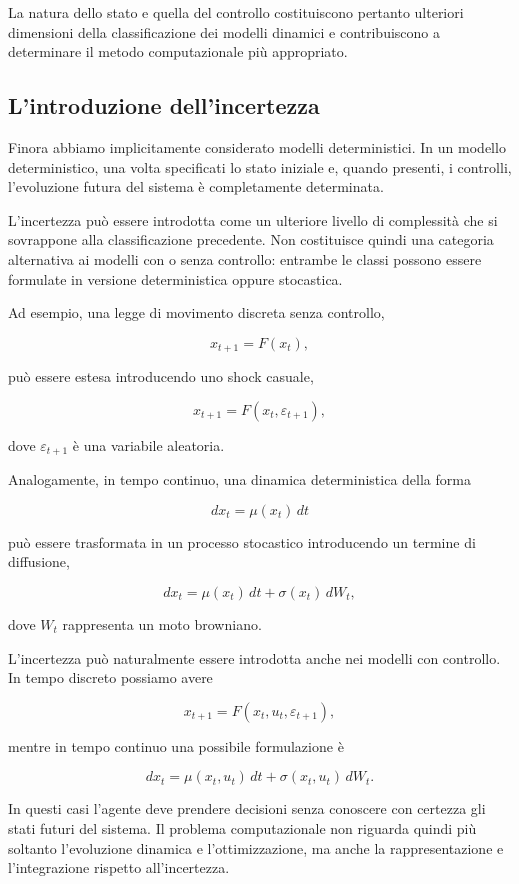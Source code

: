 \documentclass{book}
\begin{document}
La natura dello stato e quella del controllo costituiscono pertanto ulteriori dimensioni della classificazione dei modelli dinamici e contribuiscono a determinare il metodo computazionale più appropriato.

\subsection{L'introduzione dell'incertezza}

Finora abbiamo implicitamente considerato modelli deterministici. In un modello deterministico, una volta specificati lo stato iniziale e, quando presenti, i controlli, l'evoluzione futura del sistema è completamente determinata.

L'incertezza può essere introdotta come un ulteriore livello di complessità che si sovrappone alla classificazione precedente. Non costituisce quindi una categoria alternativa ai modelli con o senza controllo: entrambe le classi possono essere formulate in versione deterministica oppure stocastica.

Ad esempio, una legge di movimento discreta senza controllo,

$$
x_{t+1}=F(x_t),
$$

può essere estesa introducendo uno shock casuale,

$$
x_{t+1}=F(x_t,\varepsilon_{t+1}),
$$

dove $\varepsilon_{t+1}$ è una variabile aleatoria.

Analogamente, in tempo continuo, una dinamica deterministica della forma

$$
dx_t=\mu(x_t)\,dt
$$

può essere trasformata in un processo stocastico introducendo un termine di diffusione,

$$
dx_t=\mu(x_t)\,dt+\sigma(x_t)\,dW_t,
$$

dove $W_t$ rappresenta un moto browniano.

L'incertezza può naturalmente essere introdotta anche nei modelli con controllo. In tempo discreto possiamo avere

$$
x_{t+1}=F(x_t,u_t,\varepsilon_{t+1}),
$$

mentre in tempo continuo una possibile formulazione è

$$
dx_t=
\mu(x_t,u_t)\,dt+
\sigma(x_t,u_t)\,dW_t.
$$

In questi casi l'agente deve prendere decisioni senza conoscere con certezza gli stati futuri del sistema. Il problema computazionale non riguarda quindi più soltanto l'evoluzione dinamica e l'ottimizzazione, ma anche la rappresentazione e l'integrazione rispetto all'incertezza.
\end{document}
